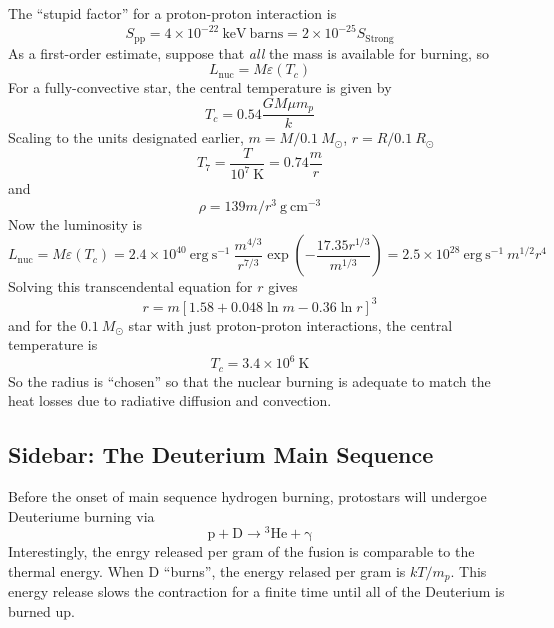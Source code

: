 \documentclass[10pt]{article}
\numberwithin{equation}{section}
\begin{document}
  The ``stupid factor'' for a proton-proton interaction is
  \begin{equation}
    \label{eq:155}
    S_{\mathrm{pp}}=4\times 10^{-22}\ \mathrm{keV\ barns}=2\times
    10^{-25}S_{\mathrm{Strong}}
  \end{equation}
  As a first-order estimate, suppose that \emph{all} the mass is
  available for burning, so 
  \begin{equation}
    \label{eq:156}
    L_{\mathrm{nuc}}=M\varepsilon(T_c)
  \end{equation}
  For a fully-convective star, the central temperature is given by
  \begin{equation}
    \label{eq:157}
    T_c=0.54\frac{GM\mu m_p}{k}
  \end{equation}
  Scaling to the units designated earlier, $m=M/0.1\ M_\odot$,
  $r=R/0.1\ R_\odot$
  \begin{equation}
    \label{eq:158}
    T_7=\frac{T}{10^7\ \mathrm{K}}=0.74\frac{m}{r}
  \end{equation}
  and
  \begin{equation}
    \label{eq:159}
    \rho=139 m/r^3\ \mathrm{g\ cm^{-3}}
  \end{equation}
  Now the luminosity is
  \begin{equation}
    \label{eq:160}
    L_{\mathrm{nuc}}=M\varepsilon(T_c)=2.4\times 10^{40}\ \mathrm{erg\
      s^{-1}}\ \frac{m^{4/3}}{r^{7/3}}\exp\left(-\frac{17.35
        r^{1/3}}{m^{1/3}}\right)=2.5\times 10^{28}\ \mathrm{erg\ s^{-1}}\ m^{1/2}r^4
  \end{equation}
  Solving this transcendental equation for $r$ gives
  \begin{equation}
    \label{eq:161}
    r=m\left[1.58+0.048\ln m-0.36\ln r\right]^3
  \end{equation}
  and for the $0.1\ M_\odot$ star with just proton-proton
  interactions, the central temperature is
  \begin{equation}
    \label{eq:162}
    T_c=3.4\times 10^6\ \mathrm{K}
  \end{equation}
  So the radius is ``chosen'' so that the nuclear burning is adequate
  to match the heat losses due to radiative diffusion and convection.

  \subsection{Sidebar: The Deuterium Main Sequence}
  \label{sec:deut-main-sequ}

  Before the onset of main sequence hydrogen burning, protostars will
  undergoe Deuteriume burning via
  \begin{equation}
    \label{eq:163}
    \mathrm{p+D\to {}^3He+\gamma}
  \end{equation}
  Interestingly, the enrgy released per gram of the fusion is
  comparable to the thermal energy. When D ``burns'', the energy
  relased per gram is $kT/m_p$. This energy release slows the
  contraction for a finite time until all of the Deuterium is burned
  up.
\end{document}
